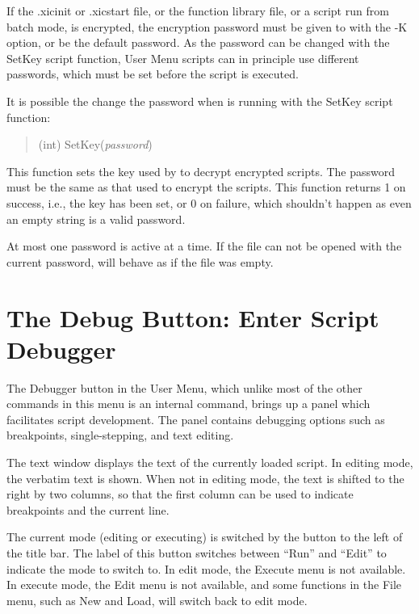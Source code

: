 If the {\vt .xicinit} or {\vt .xicstart} file, or the function library
file, or a script run from batch mode, is encrypted, the encryption
password must be given to {\Xic} with the {\vt -K} option, or be the
default password.  As the password can be changed with the {\vt
SetKey} script function, {\cb User Menu} scripts can in principle use
different passwords, which must be set before the script is executed.

It is possible the change the password when {\Xic} is running with the
{\vt SetKey} script function:
\begin{quote}
(int) {\vt SetKey}({\it password\/})
\end{quote}

This function sets the key used by {\Xic} to decrypt encrypted
scripts.  The password must be the same as that used to encrypt the
scripts.  This function returns 1 on success, i.e., the key has been
set, or 0 on failure, which shouldn't happen as even an empty string
is a valid password.

At most one password is active at a time.  If the file can not be
opened with the current password, {\Xic} will behave as if the file
was empty.


\section{The {\cb Debug} Button: Enter Script Debugger}

The {\cb Debugger} button in the {\cb User Menu}, which unlike most of
the other commands in this menu is an internal command, brings up a
panel which facilitates script development.  The panel contains
debugging options such as breakpoints, single-stepping, and text
editing.

The text window displays the text of the currently loaded script.  In
editing mode, the verbatim text is shown.  When not in editing mode,
the text is shifted to the right by two columns, so that the first
column can be used to indicate breakpoints and the current line.

The current mode (editing or executing) is switched by the button to
the left of the title bar.  The label of this button switches between
``{\vt Run}'' and ``{\vt Edit}'' to indicate the mode to switch to. 
In edit mode, the {\cb Execute} menu is not available.  In execute
mode, the {\cb Edit} menu is not available, and some functions in the
{\cb File} menu, such as {\cb New} and {\cb Load}, will switch back to
edit mode.

